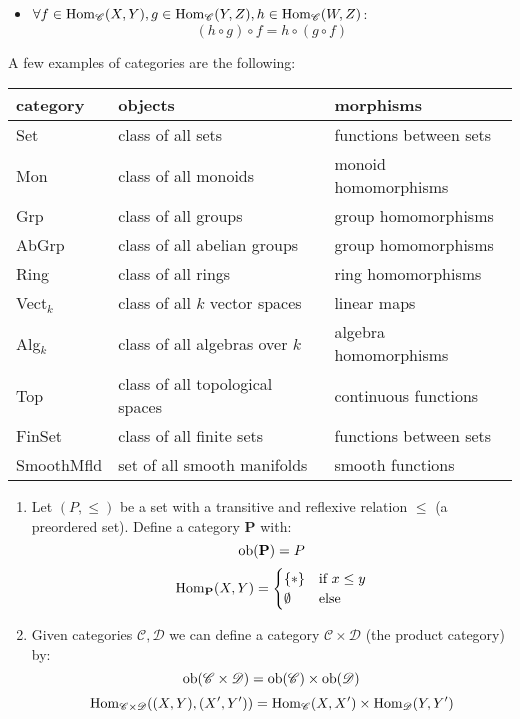 \begin{defn}
\begin{itemize}
        \item $\forall f\in \operatorname{Hom}_{\mathscr{C}}(X,Y), g\in \operatorname{Hom}_{\mathscr{C}}(Y,Z), h\in \operatorname{Hom}_{\mathscr{C}}(W,Z)$:
        \begin{equation}
            (h\circ g)\circ f=h\circ (g\circ f) \tag{associativity}
        \end{equation}
        \end{itemize}
\end{defn}

\begin{ex}
A few examples of categories are the following:
\begin{center}
    \begin{tabular}{l|l|l}
    category & objects & morphisms \\ \hline \hline
    Set & class of all sets & functions between sets \\ \hline 
    Mon & class of all monoids & monoid homomorphisms \\ \hline
    Grp & class of all groups & group homomorphisms \\ \hline
    AbGrp & class of all abelian groups & group homomorphisms \\ \hline
    Ring & class of all rings & ring homomorphisms \\ \hline
    Vect${}_k$ & class of all $k$ vector spaces & linear maps \\ \hline
    Alg${}_k$ & class of all algebras over $k$ & algebra homomorphisms \\ \hline
    Top & class of all topological spaces & continuous functions \\ \hline
    FinSet & class of all finite sets & functions between sets \\ \hline
    SmoothMfld & set of all smooth manifolds & smooth functions \\ 
    \end{tabular}
\end{center}
    \begin{enumerate}
        \item Let $(P,\leq)$ be  a set with a transitive and reflexive relation $\leq$ (a preordered set).
        Define a category $\mathbf{P}$ with: 
        $$\operatorname{ob}(\mathbf{P})=P$$
        $$ \operatorname{Hom}_{\mathbf{P}}(X,Y)=\begin{cases}
            \{\ast\} & \text{if } x\leq y \\
            \emptyset & \text{else}
        \end{cases}$$
        \item Given categories $\mathscr{C},\mathscr{D}$ we can define a category $\mathscr{C}\times\mathscr{D}$ (the product category) by:
        $$\operatorname{ob}(\mathscr{C}\times\mathscr{D})=\operatorname{ob}(\mathscr{C})\times \operatorname{ob}(\mathscr{D})$$
        $$\operatorname{Hom}_{\mathscr{C}\times\mathscr{D}}((X,Y),(X',Y'))=\operatorname{Hom}_{\mathscr{C}}(X,X')\times \operatorname{Hom}_{\mathscr{D}}(Y,Y')$$ 
        

\end{enumerate}
\end{ex}
